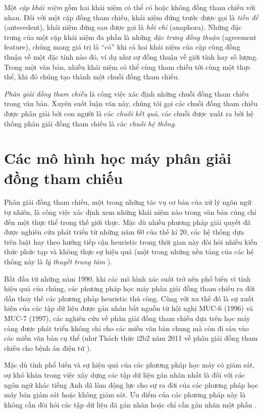 Một \emph{cặp khái niệm} gồm hai khái niệm có thể có hoặc không đồng tham chiếu với nhau. Đối với một cặp đồng tham chiếu, khái niệm đứng trước được gọi là \emph{tiền đề} (antecedent), khái niệm đứng sau được gọi là \emph{hồi chỉ} (anaphora). Những đặc trưng của một cặp khái niệm đa phần là những \emph{đặc trưng đồng thuận} (agreement feature), chúng mang giá trị là ``có'' khi cả hai khái niệm của cặp cùng đồng thuận về một đặc tính nào đó, ví dụ như sự đồng thuận về giới tính hay số lượng. Trong một văn bản, nhiều khái niệm có thể cùng tham chiếu tới cùng một thực thể, khi đó chúng tạo thành một chuỗi đồng tham chiếu.

\emph{Phân giải đồng tham chiếu} là công việc xác định những chuỗi đồng tham chiếu trong văn bản. Xuyên suốt luận văn này, chúng tôi gọi các chuỗi đồng tham chiếu được phân giải bởi con người là các \emph{chuỗi kết quả}, các chuỗi được xuất ra bởi hệ thống phân giải đồng tham chiếu là các \emph{chuỗi hệ thống}.

\section{Các mô hình học máy phân giải đồng tham chiếu\label{coref-model}}
Phân giải đồng tham chiếu, một trong những tác vụ cơ bản của xử lý ngôn ngữ tự nhiên, là công việc xác định xem những khái niệm nào trong văn bản cùng chỉ đến một thực thể trong thế giới thực. Mặc dù nhiều phương pháp giải quyết đã được nghiên cứu phát triển từ những năm 60 của thế kỉ 20, các hệ thống dựa trên luật hay theo hướng tiếp cận heuristic trong thời gian này đòi hỏi nhiều kiến thức phức tạp và không thực sự hiệu quả (một trong những nền tảng của các hệ thống này là \emph{lý thuyết trung tâm} \cite{Grosz1983}).

Bắt đầu từ những năm 1990, khi các mô hình xác suất trở nên phổ biến vì tính hiệu quả của chúng, các phương pháp học máy phân giải đồng tham chiếu ra đời dần thay thế các phương pháp heuristic thủ công. Cùng với xu thế đó là sự xuất hiện của các tập dữ liệu được gán nhãn bắt nguồn từ hội nghị MUC-6 (1996) và MUC-7 (1997), các nghiên cứu về phân giải đồng tham chiếu dựa trên học máy càng được phát triển không chỉ cho các miền văn bản chung mà còn đi sâu vào các miền văn bản cụ thể (như Thách thức i2b2 năm 2011 về phân giải đồng tham chiếu cho bệnh án điện tử \cite{OzlemUzuner2012}).

Mặc dù tính phổ biến và sự hiệu quả của các phương pháp học máy có giám sát, sự khó khăn trong việc xây dựng các tập dữ liệu gán nhãn nhất là đối với các ngôn ngữ khác tiếng Anh đã làm động lực cho sự ra đời của các phương pháp học máy bán giám sát hoặc không giám sát. Ưu điểm của các phương pháp này là không cần đòi hỏi các tập dữ liệu đã gán nhãn hoặc chỉ cần gán nhãn một phần \cite{CardieWagstaff1999}.

